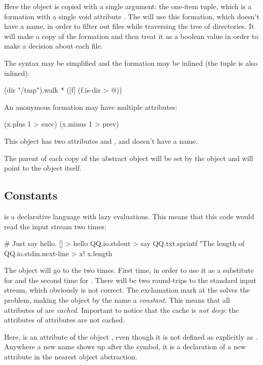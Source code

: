 Here the object  is copied with a single argument:
the one-item tuple, which is a formation with a single void attribute . The 
will use this formation, which doesn't have a name, in order
to filter out files while traversing the tree of directories. It will
make a copy of the formation and then treat it as a boolean
value in order to make a decision about each file.

The syntax may be simplified and the formation may be inlined
(the tuple is also inlined):

\begin{ffcode}
(dir "/tmp").walk
  * ([f] (f.is-dir > @))
\end{ffcode}

An anonymous formation may have multiple attributes:

\begin{ffcode}
[x] (x.plus 1 > succ) (x.minus 1 > prev)
\end{ffcode}

This object has two attributes  and , and doesn't
have a name.

The parent of each copy of the abstract object will be set by
the object  and will point to the  object itself.

\subsection{Constants}

\eolang{} is a declarative language with lazy evaluations. This means
that this code would read the input stream two times:

\begin{ffcode}
# Just say hello.
[] > hello
  QQ.io.stdout > say
    QQ.txt.sprintf
      "The length of %
      QQ.io.stdin.next-line > x!
      x.length
\end{ffcode}

The  object will go to the  two times. First time,
in order to use it as a substitute for  and the second time for
. There will be two round-trips to the standard input stream, which
obviously is not correct. The exclamation mark at the  solves the
problem, making the object by the name  a \emph{constant}. This means
that all attributes of  are \emph{cached}. Important to notice
that the cache is \emph{not deep}: the attributes of attributes are not cached.

Here,  is an attribute of the object , even though
it is not defined as explicitly as . Anywhere a new
name shows up after the \ff{>} symbol, it is a declaration of a new
attribute in the nearest object abstraction.

